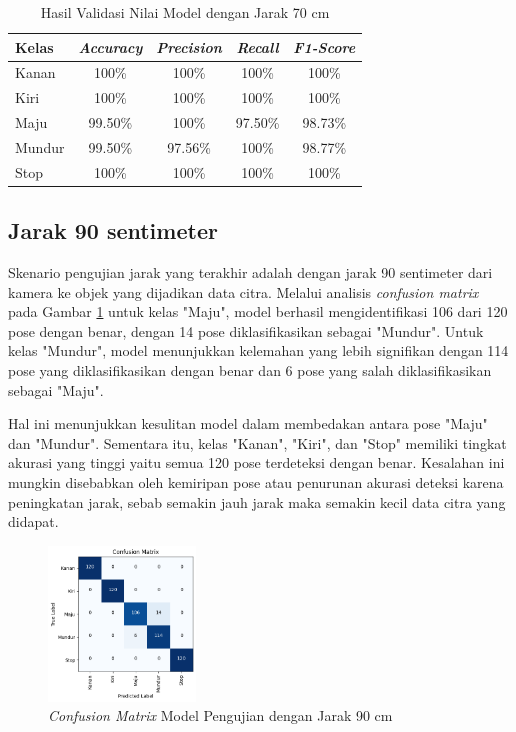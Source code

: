 \begin{longtable}{|l|c|c|c|c|}
  \caption{Hasil Validasi Nilai Model dengan Jarak 70 cm}
  \label{tb:vs_model5} \\
  \hline
  \rowcolor[HTML]{C0C0C0} 
  \textbf{Kelas} & \textbf{\emph{Accuracy}} & \textbf{\emph{Precision}} & \textbf{\emph{Recall}} & \textbf{\emph{F1-Score}} \\ \hline
  Kanan    & 100\%            & 100\%             & 100\%           & 100\%            \\ \hline
  Kiri     & 100\%          & 100\%           & 100\%           & 100\%           \\ \hline
  Maju      & 99.50\%          & 100\%           & 97.50\%          & 98.73\%          \\ \hline
  Mundur     & 99.50\%            & 97.56\%             & 100\%           & 98.77\%            \\ \hline
  Stop  & 100\%            & 100\%             & 100\%           & 100\%            \\ \hline
\end{longtable}

\subsection{Jarak 90 sentimeter}

Skenario pengujian jarak yang terakhir adalah dengan jarak 90 sentimeter dari kamera ke objek yang dijadikan data citra. Melalui analisis \emph{confusion matrix} pada Gambar \ref{fig:matrix6} untuk kelas "Maju", model berhasil mengidentifikasi 106 dari 120 pose dengan benar, dengan 14 pose diklasifikasikan sebagai "Mundur". Untuk kelas "Mundur", model menunjukkan kelemahan yang lebih signifikan dengan 114 pose yang diklasifikasikan dengan benar dan 6 pose yang salah diklasifikasikan sebagai "Maju". 

Hal ini menunjukkan kesulitan model dalam membedakan antara pose "Maju" dan "Mundur". Sementara itu, kelas "Kanan", "Kiri", dan "Stop" memiliki tingkat akurasi yang tinggi yaitu semua 120 pose terdeteksi dengan benar. Kesalahan ini mungkin disebabkan oleh kemiripan pose atau penurunan akurasi deteksi karena peningkatan jarak, sebab semakin jauh jarak maka semakin kecil data citra yang didapat. 
  
\begin{figure} [H] \centering
  \includegraphics[width=0.35\textwidth]{gambar/bab4/model8 (90cm)/confusion.png}
  \caption{\emph{Confusion Matrix} Model Pengujian dengan Jarak 90 cm}
  \label{fig:matrix6}
\end{figure}

